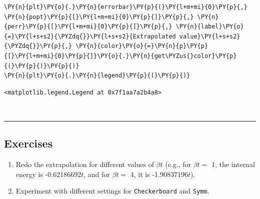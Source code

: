 \begin{tcolorbox}[breakable, size=fbox, boxrule=1pt, pad at break*=1mm,colback=cellbackground, colframe=cellborder]
\begin{Verbatim}[commandchars=\\\{\}]
\PY{n}{plt}\PY{o}{.}\PY{n}{errorbar}\PY{p}{(}\PY{l+m+mi}{0}\PY{p}{,} \PY{n}{popt}\PY{p}{[}\PY{l+m+mi}{0}\PY{p}{]}\PY{p}{,} \PY{n}{perr}\PY{p}{[}\PY{l+m+mi}{0}\PY{p}{]}\PY{p}{,} \PY{n}{label}\PY{o}{=}\PY{l+s+s2}{\PYZdq{}}\PY{l+s+s2}{Extrapolated value}\PY{l+s+s2}{\PYZdq{}}\PY{p}{,} \PY{n}{color}\PY{o}{=}\PY{n}{p}\PY{p}{[}\PY{l+m+mi}{0}\PY{p}{]}\PY{o}{.}\PY{n}{get\PYZus{}color}\PY{p}{(}\PY{p}{)}\PY{p}{)}
\PY{n}{plt}\PY{o}{.}\PY{n}{legend}\PY{p}{(}\PY{p}{)}
\end{Verbatim}
\end{tcolorbox}

            \begin{tcolorbox}[breakable, size=fbox, boxrule=.5pt, pad at break*=1mm, opacityfill=0]
\begin{Verbatim}[commandchars=\\\{\}]
<matplotlib.legend.Legend at 0x7f1aa7a2b4a8>
\end{Verbatim}
\end{tcolorbox}
        
    \begin{center}
    \end{center}
    { \hspace*{\fill} \\}
    
    \begin{center}\rule{0.5\linewidth}{0.5pt}\end{center}

\hypertarget{exercises}{%
\subsection{Exercises}\label{exercises}}

\begin{enumerate}
\def\labelenumi{\arabic{enumi}.}
\tightlist
\item
  Redo the extrapolation for different values of \(\beta t\) (e.g., for
  \(\beta t =\) 1, the internal energy is -0.62186692\(t\), and for
  \(\beta t =\) 4, it is -1.90837196\(t\)).
\item
  Experiment with different settings for \texttt{Checkerboard} and
  \texttt{Symm}.
\end{enumerate}


    
    
    

